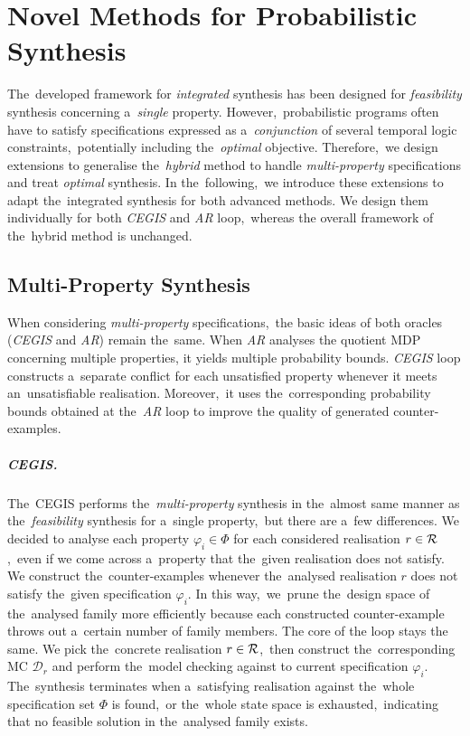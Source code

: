 \chapter{Novel Methods for Probabilistic Synthesis}\label{chap:advanced}
The~developed framework for \textit{integrated} synthesis has been designed for \textit{feasibility} synthesis concerning a~\textit{single} property.
However,~probabilistic programs often have to satisfy specifications expressed as a~\textit{conjunction} of several temporal logic constraints,~potentially including the~\textit{optimal} objective.
Therefore,~we design extensions to generalise the~\textit{hybrid} method to handle \textit{multi-property} specifications and treat \textit{optimal} synthesis.
In the~following,~we introduce these extensions to adapt the~integrated synthesis for both advanced methods. 
We design them individually for both \emph{CEGIS} and \emph{AR} loop,~whereas the overall framework of the~hybrid method is unchanged.

\section{Multi-Property Synthesis}
When considering \textit{multi-property} specifications,~the basic ideas of both oracles (\textit{CEGIS} and \textit{AR}) remain the~same.
When \textit{AR} analyses the quotient MDP concerning multiple properties, it yields multiple probability bounds.
\textit{CEGIS} loop constructs a~separate conflict for each unsatisfied property whenever it meets an~unsatisfiable realisation.
Moreover,~it uses the~corresponding probability bounds obtained at the~\textit{AR} loop to improve the quality of generated counter-examples.

\paragraph{CEGIS.}
The~CEGIS performs the~\textit{multi-property} synthesis in the~almost same manner as the~\textit{feasibility} synthesis for a~single property,~but there are a~few differences.
We decided to analyse each property $\varphi_i \in \varPhi$ for each considered realisation $r \in \mathcal{R}$,~even if we come across a~property that the~given realisation does not satisfy.
We construct the~counter-examples whenever the~analysed realisation $r$ does not satisfy the~given specification $\varphi_{i}$.
In this way,~we~prune the~design space of the~analysed family more efficiently because each constructed counter-example throws out a~certain number of family members.
The core of the loop stays the same.
We pick the~concrete realisation $r \in \mathcal{R}$,~then construct the~corresponding MC $\mathcal{D}_r$ and perform the~model checking against to current specification $\varphi_i$.
The~synthesis terminates when a~satisfying realisation against the~whole specification set $\varPhi$ is found,~or the~whole state space is exhausted,~indicating that no feasible solution in the~analysed family exists.


